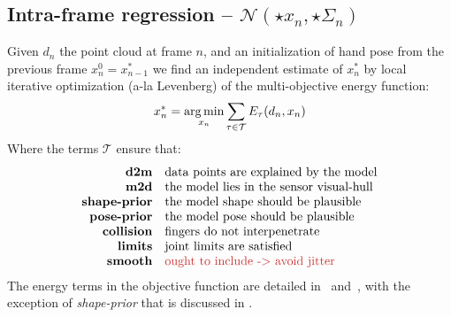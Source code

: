 \subsection{Intra-frame regression -- $\mathcal{N}(\star{x}_n, \star{\Sigma}_n)$}
\label{sec:independent}
\label{sec:intra}
% 
Given $d_n$ the point cloud at frame $n$, and an initialization of hand pose from the previous frame $x_n^0 = x_{n - 1}^*$ we find an independent estimate of $x_n^*$ by local iterative optimization (a-la Levenberg) of the multi-objective energy function:
% 
\begin{equation}
x_n^* = \operatorname*{arg\,min}_{x_n} \sum_{\tau \in \mathcal{T}} E_{\tau}(d_n, x_n) 
\label{eq:energies}
\end{equation}
% 
Where the terms $\mathcal{T}$ ensure that:
%
\begin{equation*}
\setlength{\jot}{0pt}
\begin{aligned}
\text{\textbf{d2m}} & \quad \text{data points are explained by the model} \\ 
\text{\textbf{m2d}} & \quad \text{the model lies in the sensor visual-hull} \\
\text{\textbf{shape-prior}} & \quad \text{the model shape should be plausible} \\
\text{\textbf{pose-prior}} & \quad \text{the model pose should be plausible} \\
\text{\textbf{collision}} & \quad \text{fingers do not interpenetrate} \\
\text{\textbf{limits}} & \quad \text{joint limits are satisfied} \\
\text{\textbf{smooth}} & \quad \text{\todo{ought to include -> avoid jitter}}
\end{aligned}
\end{equation*}
The energy terms in the objective function are detailed in~\cite{tkach2016sphere} and~\cite{htrack}, with the exception of \emph{shape-prior} that is discussed in .


